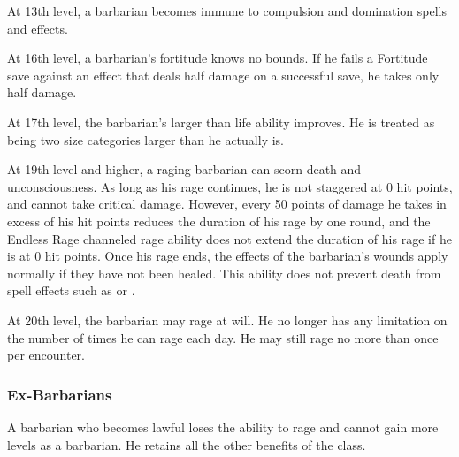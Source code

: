  At 13th level, a barbarian becomes immune to compulsion and domination spells and effects.

 At 16th level, a barbarian's fortitude knows no bounds. If he fails a Fortitude save against an effect that deals half damage on a successful save, he takes only half damage.

 At 17th level, the barbarian's larger than life ability improves. He is treated as being two size categories larger than he actually is.

 At 19th level and higher, a raging barbarian can scorn death and unconsciousness. As long as his rage continues, he is not staggered at 0 hit points, and cannot take critical damage. However, every 50 points of damage he takes in excess of his hit points reduces the duration of his rage by one round, and the Endless Rage channeled rage ability does not extend the duration of his rage if he is at 0 hit points. Once his rage ends, the effects of the barbarian's wounds apply normally if they have not been healed. This ability does not prevent death from spell effects such as  or .

 At 20th level, the barbarian may rage at will. He no longer has any limitation on the number of times he can rage each day. He may still rage no more than once per encounter.

\subsubsection{Ex-Barbarians}
A barbarian who becomes lawful loses the ability to rage and cannot
gain more levels as a barbarian. He retains all the other benefits of
the class.

